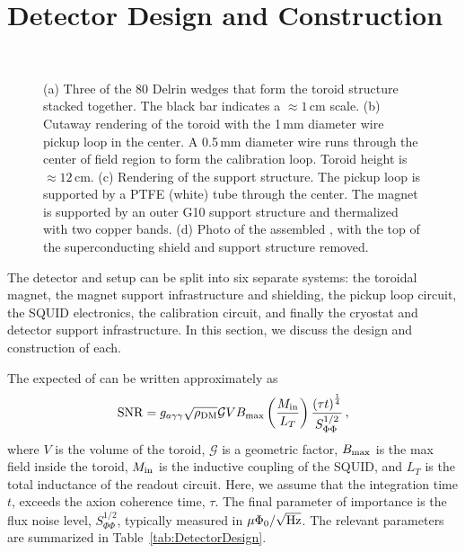 \documentclass[aps,prd,amsmath,amssymb,reprint,superscriptaddress, nofootinbib,
]{revtex4-1}
\begin{document}
\section{Detector Design and Construction}
\label{sec:DetectorDesign}
\begin{figure*}
\centering
{}\hspace{3cm}\\
\hspace{3cm}\caption{(a) Three of the 80 Delrin wedges that form the toroid structure stacked together. The black bar indicates a $\approx 1$\,cm scale. (b) Cutaway rendering of the toroid with the 1\,mm diameter wire pickup loop in the center. A 0.5\,mm diameter wire runs through the center of field region to form the calibration loop. Toroid height is $\approx 12$\,cm. (c) Rendering of the \abra support structure. The pickup loop is supported by a PTFE (white) tube through the center. The magnet is supported by an outer G10 support structure and thermalized with two copper bands. (d) Photo of the assembled \abra, with the top of the superconducting shield and support structure removed.}
\label{fig:AssemblyPhotos}
\end{figure*}

The \abra detector and setup can be split into six separate systems: the toroidal magnet, the magnet support infrastructure and shielding, the pickup loop circuit, the SQUID electronics, the calibration circuit, and finally the cryostat and detector support infrastructure. In this section, we discuss the design and construction of each.

The expected \SNR of \abra can be written approximately as 
\begin{equation}
{\rm SNR} = g_{a\gamma\gamma}\sqrt{\rho_{\rm DM}}\mathcal{G}VB_{\rm max}\left(\frac{M_{\rm in}}{L_T}\right)\frac{\left(\tau t\right)^{\frac14}}{S_{\Phi\Phi}^{1/2}}\,,
\end{equation}
where $V$ is the volume of the toroid, $\mathcal{G}$ is a geometric factor, $B_{\rm max}$ is the max field inside the toroid, $M_{\rm in}$ is the inductive coupling of the SQUID, and $L_T$ is the total inductance of the readout circuit. 
Here, we assume that the integration time $t$, exceeds the axion coherence time, $\tau$. The final parameter of importance is the flux noise level, $S_{\Phi\Phi}^{1/2}$, typically measured in $\mu\Phi_0/\sqrt{\rm Hz}$. The relevant parameters are summarized in Table~\ref{tab:DetectorDesign}.
\end{document}
